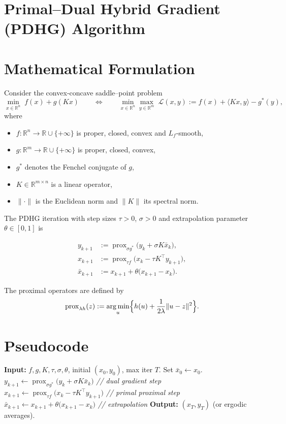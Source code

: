 \documentclass{article}
\newcommand{\prox}{\operatorname{prox}}
\newcommand{\argmin}{\operatorname*{arg\,min}}
\newcommand{\RR}{\mathbb{R}}
\begin{document}
\section*{Primal–Dual Hybrid Gradient (PDHG) Algorithm}

\section*{Mathematical Formulation}
Consider the convex‑concave saddle–point problem  
\[
\min_{x\in\RR^{n}} \; f(x) + g(Kx) \qquad\Longleftrightarrow\qquad 
\min_{x\in\RR^{n}}\max_{y\in\RR^{m}} \; \mathcal L (x,y)
:= f(x)+\langle Kx , y\rangle - g^{*}(y),
\]
where  

\begin{itemize}[nosep]
\item $f:\RR^{n}\!\to\!\RR\cup\{+\infty\}$ is proper, closed, convex and $L_f$‑smooth,
\item $g:\RR^{m}\!\to\!\RR\cup\{+\infty\}$ is proper, closed, convex,
\item $g^{*}$ denotes the Fenchel conjugate of $g$,
\item $K\in\RR^{m\times n}$ is a linear operator,
\item $\|\cdot\|$ is the Euclidean norm and $\|K\|$ its spectral norm.
\end{itemize}

The PDHG iteration with step sizes $\tau>0$, $\sigma>0$ and extrapolation
parameter $\theta\in[0,1]$ is

\[
\begin{aligned}
y_{k+1} &:= \prox_{\sigma g^{*}}\!\bigl(y_{k}+\sigma K\bar x_{k}\bigr), \tag{1}\\[4pt]
x_{k+1} &:= \prox_{\tau f}\!\bigl(x_{k}-\tau K^{\top}y_{k+1}\bigr), \tag{2}\\[4pt]
\bar x_{k+1} &:= x_{k+1}+\theta\bigl(x_{k+1}-x_{k}\bigr). \tag{3}
\end{aligned}
\]

The proximal operators are defined by
\[
\prox_{\lambda h}(z):=\argmin_{u}\Bigl\{h(u)+\frac{1}{2\lambda}\|u-z\|^{2}\Bigr\}.
\]

\section*{Pseudocode}
\begin{algorithm}[H]
\caption{Primal–Dual Hybrid Gradient (PDHG)}\label{alg:pdhg}
\begin{algorithmic}[1]
\STATE \textbf{Input:} $f,g,K,\tau,\sigma,\theta$, initial $(x_{0},y_{0})$, max iter $T$.
\STATE Set $\bar x_{0}\gets x_{0}$.
    \STATE $y_{k+1}\gets \prox_{\sigma g^{*}}\!\bigl(y_{k}+\sigma K\bar x_{k}\bigr)$ \hfill\textit{// dual gradient step}
    \STATE $x_{k+1}\gets \prox_{\tau f}\!\bigl(x_{k}-\tau K^{\top}y_{k+1}\bigr)$ \hfill\textit{// primal proximal step}
    \STATE $\bar x_{k+1}\gets x_{k+1}+\theta\bigl(x_{k+1}-x_{k}\bigr)$ \hfill\textit{// extrapolation}
\ENDFOR
\STATE \textbf{Output:} $(x_{T},y_{T})$ (or ergodic averages).
\end{algorithmic}
\end{algorithm}
\end{document}
